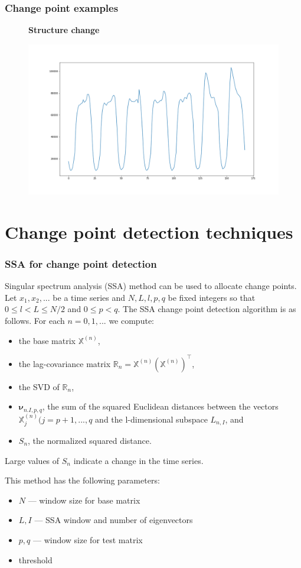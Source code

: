 \documentclass[intlimits, 9pt, unicode]{beamer}
\begin{document}
\begin{frame}
\frametitle{Change point examples}
\begin{figure}
\textbf{Structure change}\par\medskip
\includegraphics[scale=0.30]{images/006_structure}
\end{figure}
\end{frame}


\section{Change point detection techniques}

\begin{frame}
    \frametitle{SSA for change point detection}

Singular spectrum analysis (SSA) method can be used to allocate change points.
Let $x_1,x_2,...$ be a time series and $N, L, l, p, q$ be fixed integers so that $0 \leq l < L \leq N/2$ and $ 0 \leq p < q$. The SSA change point detection algorithm is as follows.
For each $ n = 0,1,...$ we compute:
    \begin{itemize}
    	\item the base matrix $\mathbb{X}^{(n)}$,
	\item the lag-covariance matrix $\mathbb{R}_n = \mathbb{X}^{(n)}(\mathbb{X}^{(n)})^{\top}$,
	\item the SVD of $\mathbb{R}_n$,
	\item $\mathbf{\nu}_{n.I,p,q}$, the sum of the squared Euclidean distances between the vectors $\mathbb{X}_j^{(n)} (j = p+1,...,q$ and the l-dimensional subspace $L_{n,I}$, and
	\item $S_n$, the normalized squared distance.
    \end{itemize}
 Large values of $S_n$ indicate a change in the time series.

This method has the following parameters:
	\begin{itemize}
		\item $N$ --- window size for base matrix
		\item $L, I$ --- SSA window and number of eigenvectors
		\item $p, q$ --- window size for test matrix
		\item threshold
	\end{itemize}
\end{frame}
\end{document}
